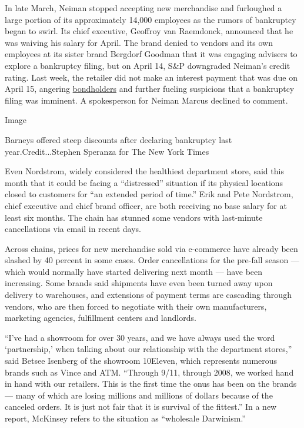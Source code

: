 In late March, Neiman stopped accepting new merchandise and furloughed a
large portion of its approximately 14,000 employees as the rumors of
bankruptcy began to swirl. Its chief executive, Geoffroy van Raemdonck,
announced that he was waiving his salary for April. The brand denied to
vendors and its own employees at its sister brand Bergdorf Goodman that
it was engaging advisers to explore a bankruptcy filing, but on April
14, S\&P downgraded Neiman's credit rating. Last week, the retailer did
not make an interest payment that was due on April 15, angering
\href{https://www.prnewswire.com/news-releases/marble-ridge-capital-sends-letter-to-board-of-directors-of-the-neiman-marcus-group-301042039.html}{bondholders}
and further fueling suspicions that a bankruptcy filing was imminent. A
spokesperson for Neiman Marcus declined to comment.

Image

Barneys offered steep discounts after declaring bankruptcy last
year.Credit...Stephen Speranza for The New York Times

Even Nordstrom, widely considered the healthiest department store, said
this month that it could be facing a ``distressed'' situation if its
physical locations closed to customers for ``an extended period of
time.'' Erik and Pete Nordstrom, chief executive and chief brand
officer, are both receiving no base salary for at least six months. The
chain has stunned some vendors with last-minute cancellations via email
in recent days.

Across chains, prices for new merchandise sold via e-commerce have
already been slashed by 40 percent in some cases. Order cancellations
for the pre-fall season --- which would normally have started delivering
next month --- have been increasing. Some brands said shipments have
even been turned away upon delivery to warehouses, and extensions of
payment terms are cascading through vendors, who are then forced to
negotiate with their own manufacturers, marketing agencies, fulfillment
centers and landlords.

``I've had a showroom for over 30 years, and we have always used the
word `partnership,' when talking about our relationship with the
department stores,'' said Betsee Isenberg of the showroom 10Eleven,
which represents numerous brands such as Vince and ATM. ``Through 9/11,
through 2008, we worked hand in hand with our retailers. This is the
first time the onus has been on the brands --- many of which are losing
millions and millions of dollars because of the canceled orders. It is
just not fair that it is survival of the fittest.'' In a new report,
McKinsey refers to the situation as ``wholesale Darwinism.''

